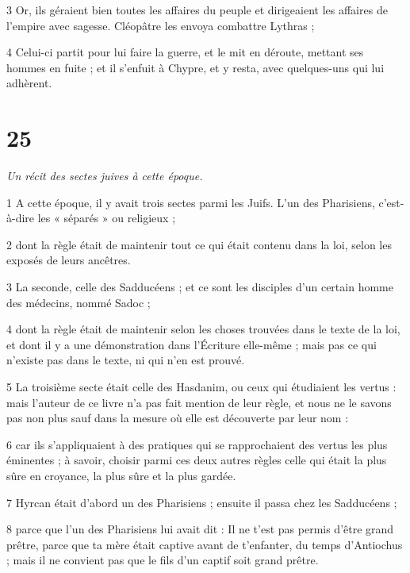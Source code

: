 \par 3 Or, ils géraient bien toutes les affaires du peuple et dirigeaient les affaires de l'empire avec sagesse. Cléopâtre les envoya combattre Lythras ;

\par 4 Celui-ci partit pour lui faire la guerre, et le mit en déroute, mettant ses hommes en fuite ; et il s'enfuit à Chypre, et y resta, avec quelques-uns qui lui adhèrent.

\chapter{25}

\par \textit{Un récit des sectes juives à cette époque.}

\par 1 A cette époque, il y avait trois sectes parmi les Juifs. L'un des Pharisiens, c'est-à-dire les « séparés » ou religieux ;

\par 2 dont la règle était de maintenir tout ce qui était contenu dans la loi, selon les exposés de leurs ancêtres.

\par 3 La seconde, celle des Sadducéens ; et ce sont les disciples d'un certain homme des médecins, nommé Sadoc ;

\par 4 dont la règle était de maintenir selon les choses trouvées dans le texte de la loi, et dont il y a une démonstration dans l'Écriture elle-même ; mais pas ce qui n'existe pas dans le texte, ni qui n'en est prouvé.

\par 5 La troisième secte était celle des Hasdanim, ou ceux qui étudiaient les vertus : mais l'auteur de ce livre n'a pas fait mention de leur règle, et nous ne le savons pas non plus sauf dans la mesure où elle est découverte par leur nom :

\par 6 car ils s'appliquaient à des pratiques qui se rapprochaient des vertus les plus éminentes ; à savoir, choisir parmi ces deux autres règles celle qui était la plus sûre en croyance, la plus sûre et la plus gardée.

\par 7 Hyrcan était d'abord un des Pharisiens ; ensuite il passa chez les Sadducéens ;

\par 8 parce que l'un des Pharisiens lui avait dit : Il ne t'est pas permis d'être grand prêtre, parce que ta mère était captive avant de t'enfanter, du temps d'Antiochus ; mais il ne convient pas que le fils d'un captif soit grand prêtre.

